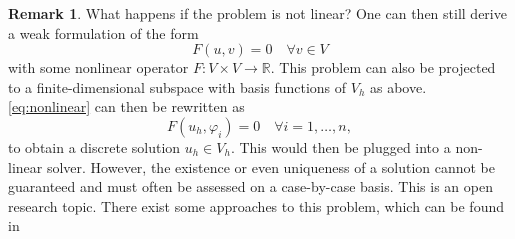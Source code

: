 \documentclass[12pt,a4paper,twoside, open=right]{scrreprt}
\theoremstyle{definition}
\newtheorem{rem}[auf]{Remark}
\theoremstyle{plain}
\newcommand{\rr}{\mathbb{R}}
\begin{document}
\begin{rem}
    What happens if the problem is not linear? One can then still derive a weak formulation of the form
    \begin{equation}
        F(u,v) = 0 \quad\forall v \in V\label{eq:nonlinear}
    \end{equation}
    with some nonlinear operator $F:V\times V\to\rr$.
    This problem can also be projected to a finite-dimensional subspace with basis functions of $V_h$ as above. \eqref{eq:nonlinear} can then be rewritten as 
    \begin{equation}
        F(u_h, \varphi_i) = 0 \quad \forall i=1,\dotsc,n,
    \end{equation}
    to obtain a discrete solution $u_h\in V_h$. This would then be plugged into a non-linear solver. However, the existence or even uniqueness of a solution cannot be guaranteed and must often be assessed on a case-by-case basis. This is an open research topic. There exist some approaches to this problem, which can be found in \cite{Girault1986}
\end{rem}
\end{document}
